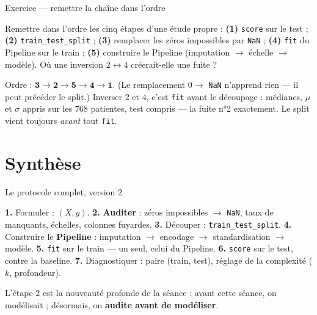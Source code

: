 \documentclass[aspectratio=169,11pt]{beamer}
\begin{document}
\begin{frame}{Exercice — remettre la chaîne dans l'ordre}
\begin{ucadrec}[Énoncé]
{\small Remettre dans l'ordre les cinq étapes d'une étude propre : \textbf{(1)} \texttt{score} sur le test ; \textbf{(2)} \texttt{train\_test\_split} ; \textbf{(3)} remplacer les zéros impossibles par \texttt{NaN} ; \textbf{(4)} \texttt{fit} du Pipeline sur le train ; \textbf{(5)} construire le Pipeline (imputation $\to$ échelle $\to$ modèle). Où une inversion $2 \leftrightarrow 4$ créerait-elle une fuite ?}
\end{ucadrec}
\pause
\begin{ucadex}[Correction]
{\small Ordre : $\mathbf{3 \to 2 \to 5 \to 4 \to 1}$. (Le remplacement $0 \to$ \texttt{NaN} n'apprend rien — il peut précéder le split.) Inverser $2$ et $4$, c'est \texttt{fit} avant le découpage : médianes, $\mu$ et $\sigma$ appris sur les $768$ patientes, test compris — la fuite n°2 exactement. Le split vient toujours \emph{avant} tout \texttt{fit}.}
\end{ucadex}
\end{frame}

\section{Synthèse}

\begin{frame}{Le protocole complet, version 2}
\begin{ucadret}
{\small \textbf{1.} Formuler : $(X, y)$. \;\textbf{2.} \textbf{Auditer} : zéros impossibles $\to$ \texttt{NaN}, taux de manquants, échelles, colonnes fuyardes. \;\textbf{3.} Découper : \texttt{train\_test\_split}. \;\textbf{4.} Construire le \textbf{Pipeline} : imputation $\to$ encodage $\to$ standardisation $\to$ modèle. \;\textbf{5.} \texttt{fit} sur le train — un seul, celui du Pipeline. \;\textbf{6.} \texttt{score} sur le test, contre la baseline. \;\textbf{7.} Diagnostiquer : paire (train, test), réglage de la complexité ($k$, profondeur).}
\end{ucadret}
{\small L'étape $2$ est la nouveauté profonde de la séance : avant cette séance, on modélisait ; désormais, on \textbf{audite avant de modéliser}.}
\end{frame}
\end{document}
